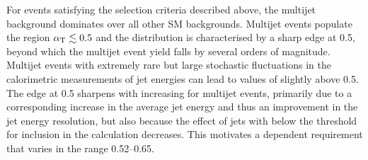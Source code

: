 For events satisfying the selection criteria described above, the
multijet background dominates over all other SM backgrounds. Multijet
events populate the region $\alpha_{\text T} \lesssim 0.5$ and the \alphat
distribution is characterised by a sharp edge at 0.5, beyond which the
multijet event yield falls by several orders of magnitude.%
Multijet events with extremely rare but large stochastic fluctuations in the
calorimetric measurements of jet energies can lead to values of
\alphat slightly above 0.5. The edge at 0.5 sharpens with increasing
\scalht for multijet events, primarily due to a corresponding increase
in the average jet energy and thus an improvement in the jet energy
resolution, but also because the effect of jets with \et below the
threshold for inclusion in the \alphat calculation decreases. This
motivates a \scalht dependent \alphat requirement that varies in the
range 0.52--0.65. 


